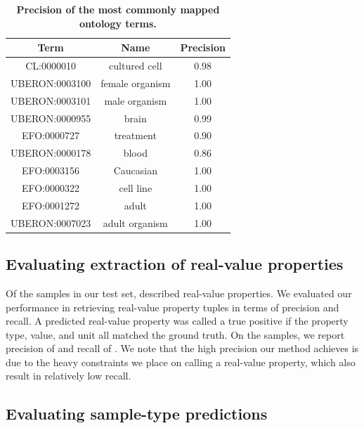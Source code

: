     \begin{table}[h!]
    \begin{center}
    \begin{tabular}{ |c|c|c| } 
    \hline
    Term & Name & Precision \\ \hline
    CL:0000010 & cultured cell & 0.98 \\
    UBERON:0003100 & female organism & 1.00 \\
    UBERON:0003101 & male organism & 1.00 \\
    UBERON:0000955 & brain & 0.99 \\
    EFO:0000727 & treatment & 0.90 \\
    UBERON:0000178 & blood & 0.86 \\
    EFO:0003156 & Caucasian & 1.00 \\
    EFO:0000322 & cell line & 1.00 \\
    EFO:0001272 & adult & 1.00 \\
    UBERON:0007023 & adult organism & 1.00 \\
    \hline
    \end{tabular}
    \end{center}
    \caption{\textbf{Precision of the most commonly mapped ontology terms.}}
    \label{table:top_terms}
    \end{table}


\subsection{Evaluating extraction of real-value properties}

Of the \TestSetSize{} samples in our test set, \TestSetRealValSize{} described real-value properties.  We evaluated our performance in retrieving real-value property tuples in terms of precision and recall. A predicted real-value property was called a true positive if the property type, value, and unit all matched the ground truth.  On the \TestSetRealValSize{} samples, we report precision of \RealValPrecision{} and recall of \RealValRecall{}. We note that the high precision our method achieves is due to the heavy constraints we place on calling a real-value property, which also result in relatively low recall.

\subsection{Evaluating sample-type predictions}

